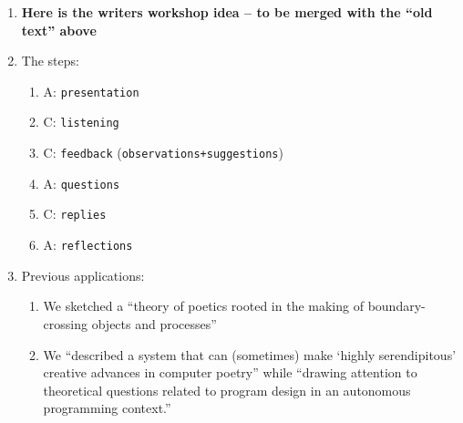 \begin{enumerate}
\item \textbf{Here is the writers workshop idea -- to be merged with the ``old text'' above}
\item[] The steps:
\begin{enumerate}
\item A: {\tt presentation}
\item C: {\tt listening}
\item C: {\tt feedback} ({\tt observations}{\tt+}{\tt suggestions})
\item A: {\tt questions}
\item C: {\tt replies}
\item A: {\tt reflections}
\end{enumerate}
\item[] Previous applications:
\begin{enumerate}[label=(\roman*)]
\item We sketched a ``theory of poetics rooted in the making of
  boundary-crossing objects and processes''
\item We ``described a system that can (sometimes) make `highly
  serendipitous' creative advances in computer poetry'' while
  ``drawing attention to theoretical questions related to program
  design in an autonomous programming context.''
\end{enumerate}
\end{enumerate}
